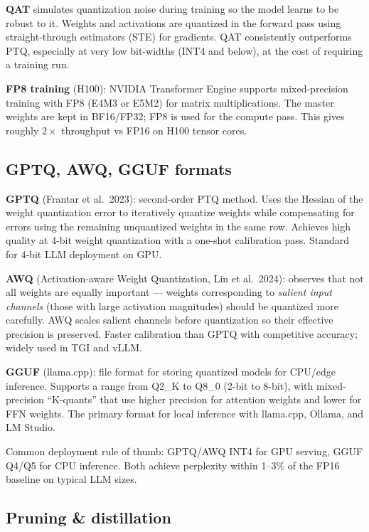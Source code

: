 \textbf{QAT} simulates quantization noise during training so the model learns to be
robust to it. Weights and activations are quantized in the forward pass using
straight-through estimators (STE) for gradients. QAT consistently outperforms PTQ,
especially at very low bit-widths (INT4 and below), at the cost of requiring a
training run.

\textbf{FP8 training} (H100): NVIDIA Transformer Engine supports mixed-precision
training with FP8 (E4M3 or E5M2) for matrix multiplications. The master weights are
kept in BF16/FP32; FP8 is used for the compute pass. This gives roughly $2\times$
throughput vs FP16 on H100 tensor cores.

\subsection{GPTQ, AWQ, GGUF formats}

\textbf{GPTQ} (Frantar et al.\ 2023): second-order PTQ method. Uses the Hessian of
the weight quantization error to iteratively quantize weights while compensating for
errors using the remaining unquantized weights in the same row. Achieves high quality
at 4-bit weight quantization with a one-shot calibration pass. Standard for 4-bit LLM
deployment on GPU.

\textbf{AWQ} (Activation-aware Weight Quantization, Lin et al.\ 2024): observes that
not all weights are equally important --- weights corresponding to \emph{salient input
channels} (those with large activation magnitudes) should be quantized more carefully.
AWQ scales salient channels before quantization so their effective precision is
preserved. Faster calibration than GPTQ with competitive accuracy; widely used in
TGI and vLLM.

\textbf{GGUF} (llama.cpp): file format for storing quantized models for CPU/edge
inference. Supports a range from Q2\_K to Q8\_0 (2-bit to 8-bit), with mixed-precision
``K-quants'' that use higher precision for attention weights and lower for FFN weights.
The primary format for local inference with llama.cpp, Ollama, and LM Studio.

\begin{notebox}
  Common deployment rule of thumb: GPTQ/AWQ INT4 for GPU serving, GGUF Q4/Q5 for CPU
  inference. Both achieve perplexity within 1--3\% of the FP16 baseline on typical
  LLM sizes.
\end{notebox}

\subsection{Pruning \& distillation}

